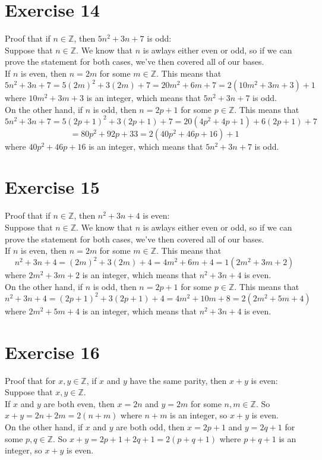 \documentclass[12pt]{article}
\newcommand{\Z}{\mathbb{Z}}
\begin{document}
    \section*{Exercise 14}
    Proof that if $n \in \Z$,
    then $5n^2 + 3n + 7$ is odd: \\
    Suppose that $n \in \Z$.
    We know that $n$ is awlays either even or odd,
    so if we can prove the statement for both cases,
    we've then covered all of our bases. \\
    If $n$ is even,
    then $n = 2m$ for some $m \in \Z$.
    This means that 
    \[ 5n^2 + 3n + 7 = 5(2m)^2 + 3(2m) + 7 = 20m^2 + 6m + 7
    = 2(10m^2 + 3m + 3) + 1 \]
    where $10m^2 + 3m + 3$ is an integer,
    which means that $5n^2 + 3n + 7$ is odd. \\
    On the other hand, if $n$ is odd,
    then $n = 2p + 1$ for some $p \in \Z$.
    This means that 
    \[ 5n^2 + 3n + 7 = 5(2p+1)^2 + 3(2p+1) + 7
    = 20(4p^2 + 4p + 1) + 6(2p+1) + 7 \]
    \[ = 80p^2 + 92p + 33
    = 2(40p^2 + 46p + 16) + 1 \]
    where $40p^2 + 46p + 16$ is an integer,
    which means that $5n^2 + 3n + 7$ is odd. \\

    \section*{Exercise 15}
    Proof that if $n \in \Z$,
    then $n^2 + 3n + 4$ is even: \\
    Suppose that $n \in \Z$.
    We know that $n$ is awlays either even or odd,
    so if we can prove the statement for both cases,
    we've then covered all of our bases. \\
    If $n$ is even,
    then $n = 2m$ for some $m \in \Z$.
    This means that 
    \[ n^2 + 3n + 4 = (2m)^2 + 3(2m) + 4 = 4m^2 + 6m + 4
    = 1(2m^2 + 3m + 2) \]
    where $2m^2 + 3m + 2$ is an integer,
    which means that $n^2 + 3n + 4$ is even. \\
    On the other hand, if $n$ is odd,
    then $n = 2p + 1$ for some $p \in \Z$.
    This means that 
    \[ n^2 + 3n + 4 = (2p+1)^2 + 3(2p+1) + 4 = 4m^2 + 10m + 8
    = 2(2m^2 + 5m + 4) \]
    where $2m^2 + 5m + 4$ is an integer,
    which means that $n^2 + 3n + 4$ is even. \\

    \section*{Exercise 16}
    Proof that for $x, y \in \Z$,
    if $x$ and $y$ have the same parity,
    then $x+y$ is even: \\
    Suppose that $x, y \in \Z$. \\
    If $x$ and $y$ are both even,
    then $x = 2n$ and $y=2m$ for some $n, m \in \Z$.
    So $x+y = 2n + 2m = 2(n+m)$
    where $n+m$ is an integer,
    so $x+y$ is even. \\
    On the other hand, 
    if $x$ and $y$ are both odd,
    then $x = 2p+1$ and $y=2q+1$ for some $p, q \in \Z$.
    So $x+y = 2p+1 + 2q+1 = 2(p+q+1)$
    where $p+q+1$ is an integer,
    so $x+y$ is even. \\
\end{document}
